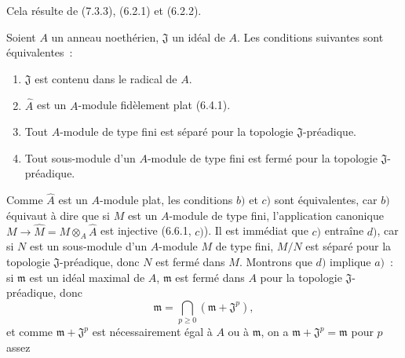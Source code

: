 Cela résulte de (7.3.3), (6.2.1) et (6.2.2).

\begin{corollary}[7.3.5]
\label{0.7.3.5-fr}
Soient $A$ un anneau noethérien, $\mathfrak J$ un idéal de $A$. Les
conditions suivantes sont équivalentes~:
\begin{enumerate}
  \item[$a)$] $\mathfrak J$ est contenu dans le radical de $A$.
  \item[$b)$] $\widehat A$ est un $A$-module fidèlement plat (6.4.1).
  \item[$c)$] Tout $A$-module de type fini est séparé pour la topologie
  $\mathfrak J$-préadique.
  \item[$d)$] Tout sous-module d'un $A$-module de type fini est fermé pour la
  topologie $\mathfrak J$-préadique.
\end{enumerate}
\end{corollary}

Comme $\widehat A$ est un $A$-module plat, les conditions $b)$ et $c)$ sont
équivalentes, car $b)$ équivaut à dire que si $M$ est un $A$-module de type
fini, l'application canonique
$M\to\widehat M=M\otimes_A\widehat A$ est injective (6.6.1, $c)$). Il est
immédiat que $c)$ entraîne $d)$, car si $N$ est un sous-module d'un $A$-module
$M$ de type fini, $M/N$ est séparé pour la topologie $\mathfrak J$-préadique,
donc $N$ est fermé dans $M$. Montrons que $d)$ implique $a)$~: si
$\mathfrak m$ est un idéal maximal de $A$, $\mathfrak m$ est fermé dans $A$
pour la topologie $\mathfrak J$-préadique, donc
\[
  \mathfrak m=\bigcap_{p\geq0}(\mathfrak m+\mathfrak J^p),
\]
et comme $\mathfrak m+\mathfrak J^p$ est nécessairement égal à $A$ ou à
$\mathfrak m$, on a $\mathfrak m+\mathfrak J^p=\mathfrak m$ pour $p$ assez

